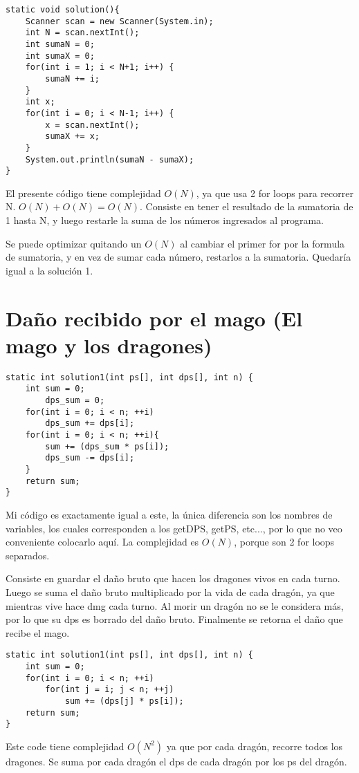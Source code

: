 \documentclass[a4paper,11pt]{article}
\theoremstyle{mytheor}
\begin{document}
\begin{lstlisting}[label={list:fourth},caption=Solución Diagnóstico.]
static void solution(){
	Scanner scan = new Scanner(System.in);
	int N = scan.nextInt();	
	int sumaN = 0;
	int sumaX = 0;
	for(int i = 1; i < N+1; i++) {
		sumaN += i;
	}
	int x;
	for(int i = 0; i < N-1; i++) {
		x = scan.nextInt();
		sumaX += x;
	}
	System.out.println(sumaN - sumaX);
}
\end{lstlisting}
El presente código tiene complejidad $O(N)$, ya que usa 2 for loops para recorrer N. 
$O(N) + O(N) = O(N)$. 
Consiste en tener el resultado de la sumatoria de 1 hasta N, y luego restarle la suma de los números ingresados al programa.

Se puede optimizar quitando un $O(N)$ al cambiar el primer for por la formula de sumatoria, y en vez de sumar cada número, restarlos a la sumatoria. Quedaría igual a la solución 1.

\pagebreak
\section*{Daño recibido por el mago (El mago y los dragones)}

\begin{lstlisting}[label={list:first},caption=Solución 1 y Diagnóstico.]
static int solution1(int ps[], int dps[], int n) {
	int sum = 0;
		dps_sum = 0;
	for(int i = 0; i < n; ++i)
		dps_sum += dps[i];
	for(int i = 0; i < n; ++i){
		sum += (dps_sum * ps[i]);
		dps_sum -= dps[i];
	}
	return sum;
}
\end{lstlisting}
Mi código es exactamente igual a este, la única diferencia son los nombres de variables, los cuales corresponden a los getDPS, getPS, etc..., por lo que no veo conveniente colocarlo aquí.
 La complejidad es $O(N)$, porque son 2 for loops separados.

Consiste en guardar el daño bruto que hacen los dragones vivos en cada turno. Luego se suma el daño bruto multiplicado por la vida de cada dragón, ya que mientras vive hace dmg cada turno. Al morir un dragón no se le considera más, por lo que su dps es borrado del daño bruto. Finalmente se retorna el daño que recibe el mago.


\begin{lstlisting}[label={list:second},caption=Solución 1.]
static int solution1(int ps[], int dps[], int n) {
	int sum = 0;
	for(int i = 0; i < n; ++i)
		for(int j = i; j < n; ++j)
			sum += (dps[j] * ps[i]);
	return sum;
}
\end{lstlisting}
Este code tiene complejidad $O(N^{2})$ ya que por cada dragón, recorre todos los dragones. Se suma por cada dragón el dps de cada dragón por los ps del dragón.
\end{document}
